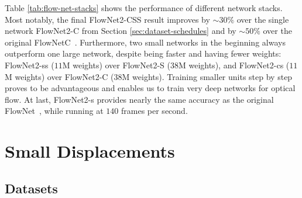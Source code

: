 \documentclass[10pt,twocolumn,letterpaper]{article}%
\begin{document}
\noindent
{}

Table \ref{tab:flow-net-stacks} shows the performance of different network stacks. Most notably, the final FlowNet2-CSS result improves by $\sim 30\%$ over the single network FlowNet2-C from Section \ref{sec:dataset-schedules} and by $\sim 50\%$ over the original FlowNetC~\cite{DFIB15}. Furthermore, two small networks in the beginning always outperform one large network, despite being faster and having fewer weights: FlowNet2-ss ($11$M weights) over FlowNet2-S ($38$M weights), and FlowNet2-cs ($11$M weights) over FlowNet2-C ($38$M weights). Training smaller units step by step proves to be advantageous and enables us to train very deep networks for optical flow. At last, FlowNet2-s provides nearly the same accuracy as the original FlowNet~\cite{DFIB15}, while running at $140$ frames per second. 

\section{Small Displacements\label{sec:small_displacements}} 

\subsection{Datasets}

\end{document}
